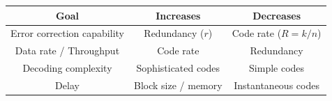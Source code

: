 \documentclass[11pt,a4paper]{book}
\begin{document}
\begin{tcolorbox}[enhanced, colback=softpeach!10, colframe=softpeach!200, title=\textbf{Key Trade-offs}]
    \begin{tabular}{c|c|c}
        \textbf{Goal}               & \textbf{Increases}  & \textbf{Decreases}    \\ \hline
        Error correction capability & Redundancy ($r$)    & Code rate ($R = k/n$) \\
        Data rate / Throughput      & Code rate           & Redundancy            \\
        Decoding complexity         & Sophisticated codes & Simple codes          \\
        Delay                       & Block size / memory & Instantaneous codes
    \end{tabular}
\end{tcolorbox}
\end{document}
